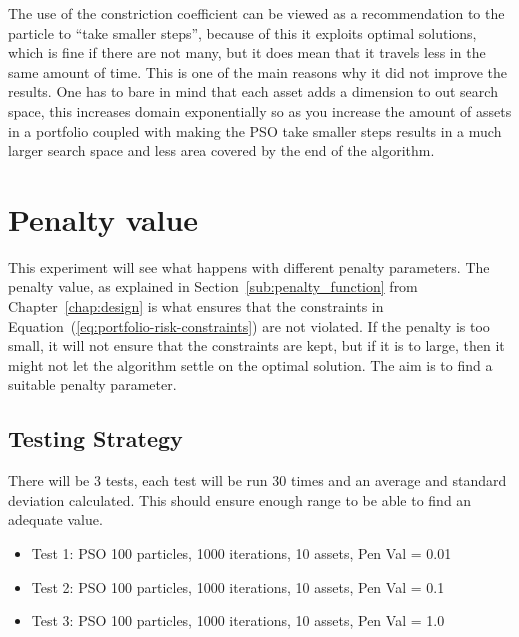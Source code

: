       The use of the constriction coefficient can be viewed as a recommendation to the particle to ``take smaller steps''\cite{constriction_factor_4}, because of this it exploits optimal solutions, which is fine if there are not many, but it does mean that it travels less in the same amount of time. This is one of the main reasons why it did not improve the results. One has to bare in mind that each asset adds a dimension to out search space, this increases domain exponentially so as you increase the amount of assets in a portfolio coupled with making the PSO take smaller steps results in a much larger search space and less area covered by the end of the algorithm. 
       



  \section{Penalty value} %
  \label{sec:penalty_value}
  This experiment will see what happens with different penalty parameters. The penalty value, as explained in Section~\ref{sub:penalty_function} from Chapter~\ref{chap:design} is what ensures that the constraints in Equation~(\ref{eq:portfolio-risk-constraints}) are not violated. If the penalty is too small, it will not ensure that the constraints are kept, but if it is to large, then it might not let the algorithm settle on the optimal solution. The aim is to find a suitable penalty parameter. 

    \subsection{Testing Strategy}
      There will be 3 tests, each test will be run 30 times and an average and standard deviation calculated. This should ensure enough range to be able to find an adequate value.
      \begin{itemize}
        \item Test 1: PSO 100 particles, 1000 iterations, 10 assets, Pen Val = 0.01
        \item Test 2: PSO 100 particles, 1000 iterations, 10 assets, Pen Val = 0.1
        \item Test 3: PSO 100 particles, 1000 iterations, 10 assets, Pen Val = 1.0
      \end{itemize}

